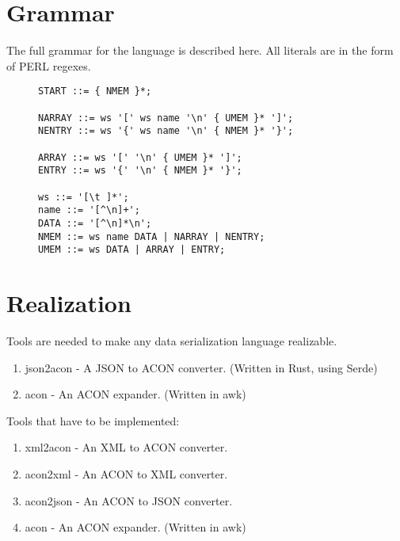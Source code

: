 \documentclass[listof=totoc]{article}
\begin{document}
\section{Grammar}
\noindent The full grammar for the language is described here. All literals are in the form of PERL regexes.


\begin{figure}[H]
\centering
\begin{varwidth}{\linewidth}
\begin{verbatim}
START ::= { NMEM }*;

NARRAY ::= ws '[' ws name '\n' { UMEM }* ']';
NENTRY ::= ws '{' ws name '\n' { NMEM }* '}';

ARRAY ::= ws '[' '\n' { UMEM }* ']';
ENTRY ::= ws '{' '\n' { NMEM }* '}';

ws ::= '[\t ]*';
name ::= '[^\n]+';
DATA ::= '[^\n]*\n';
NMEM ::= ws name DATA | NARRAY | NENTRY;
UMEM ::= ws DATA | ARRAY | ENTRY;

\end{verbatim}
\end{varwidth}
\caption{}
\end{figure}

\section{Realization}
\noindent Tools are needed to make any data serialization language realizable.

\begin{enumerate}
  \item json2acon - A JSON to ACON converter. (Written in Rust, using Serde)
  \item acon - An ACON expander. (Written in awk)
\end{enumerate}

\noindent Tools that have to be implemented:
\begin{enumerate}
  \item xml2acon - An XML to ACON converter.
  \item acon2xml - An ACON to XML converter.
  \item acon2json - An ACON to JSON converter.
  \item acon - An ACON expander. (Written in awk)
\end{enumerate}


\lstlistoflistings



\end{document}
